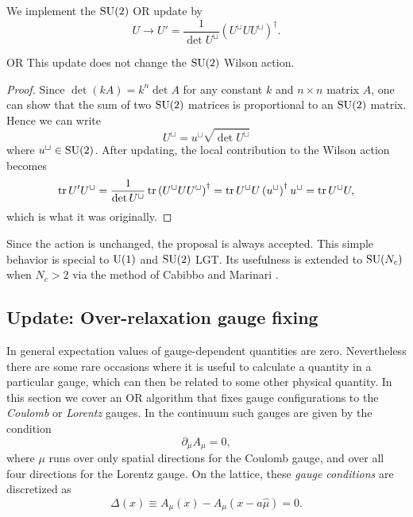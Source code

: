 We implement the $\operatorname{SU}(2)$ OR update by
\begin{equation}\label{eq:ORupdate}
  U\to U'=\frac{1}{\det U^\sqcup}\left(U^\sqcup UU^\sqcup\right)^\dagger.
\end{equation}
\begin{proposition}{}{OR}\label{prp:OR}
  This update does not change the $\operatorname{SU}(2)$ Wilson action.
  \begin{proof}
   Since $\det(kA)=k^n\det A$ for any constant $k$ and $n\times n$ matrix $A$,
   one can show that the sum of two $\operatorname{SU}(2)$ matrices is proportional
   to an $\operatorname{SU}(2)$ matrix. Hence we can write
    $$
      U^\sqcup=u^\sqcup\sqrt{\det U^\sqcup}
    $$
    where $u^\sqcup\in\operatorname{SU}(2)$. After updating, the local contribution
    to the Wilson action becomes
    \begin{equation*}
      \tr U'U^\sqcup =\frac{1}{\det U^\sqcup}\tr
                       \left(U^\sqcup UU^\sqcup\right)^\dagger
                     =\tr U^\sqcup U\left(u^\sqcup\right)^\dagger u^\sqcup
                     =\tr U^\sqcup U,
    \end{equation*}
    which is what it was originally.
  \end{proof}
\end{proposition}
Since the action is unchanged, the proposal is always accepted. This simple 
behavior is special to $\operatorname{U}(1)$ and $\operatorname{SU}(2)$ LGT. Its usefulness is 
extended to $\operatorname{SU}(N_c)$ when $N_c>2$ via the method of Cabibbo and Marinari
\cite{cabibbo_new_1982}.

\subsection{Update: Over-relaxation gauge fixing}\label{sec:ORgaugefix}

In general expectation values of gauge-dependent quantities are zero.
Nevertheless there are some rare occasions where it is useful to calculate
a quantity in a particular gauge, which can then be related to some
other physical quantity. In this section we cover an OR
algorithm that fixes gauge configurations to the {\it Coulomb} or 
{\it Lorentz} gauges.
In the continuum such gauges are given by the condition
\begin{equation}
  \partial_\mu A_\mu=0,
\end{equation}
where $\mu$ runs over only spatial directions for the Coulomb gauge, and
over all four directions for the Lorentz gauge. On the lattice, these 
{\it gauge conditions} are discretized as
\begin{equation}
  \Delta(x)\equiv A_\mu(x)-A_\mu(x-a\hat\mu) =0.
\end{equation}

